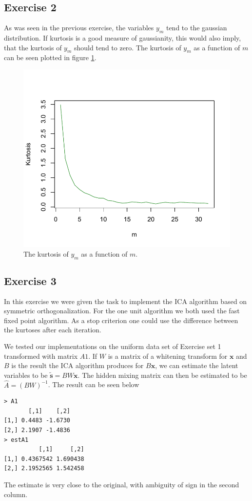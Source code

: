 \documentclass{article}
\renewcommand\vec[1]{\ensuremath{\mathbf{#1}}}
\begin{document}
\subsection{Exercise 2}
As was seen in the previous exercise, the variables $y_m$ tend to the
gaussian distribution. If kurtosis is a good measure of gaussianity,
this would also imply, that the kurtosis of $y_m$ should tend to
zero. The kurtosis of $y_m$ as a function of $m$ can be seen plotted
in figure \ref{fig:kurtosisM}.

\begin{figure}\centering
	\includegraphics[trim = 0cm 0.5cm 0cm 1cm, clip = true, totalheight=0.5\textheight]{kurtosisM.pdf}
	\caption{The kurtosis of $y_m$ as a function of $m$.} \label{fig:kurtosisM}
\end{figure}

\subsection{Exercise 3}
In this exercise we were given the task to implement the ICA algorithm
based on symmetric orthogonalization. For the one unit algorithm we
both used the fast fixed point algorithm. As a stop criterion one could use
the difference between the kurtoses after each iteration.

We tested our implementations on the uniform data set of Exercise set
1 transformed with matrix $A1$.
If $W$ is a matrix of a whitening transform for \vec{x} and $B$ is the result
the ICA algorithm produces for $B\vec x$, we can estimate the latent variables to be $\vec{\tilde{s}}=BW\vec x$.
The hidden mixing matrix can then be estimated to be $\hat{A}=(BW)^{-1}$.
The result can be seen below
\begin{verbatim}
> A1
       [,1]    [,2]
[1,] 0.4483 -1.6730
[2,] 2.1907 -1.4836
> estA1
          [,1]     [,2]
[1,] 0.4367542 1.690438
[2,] 2.1952565 1.542458
\end{verbatim}
The estimate is very close to the original, with ambiguity
of sign in the second column.
\end{document}
